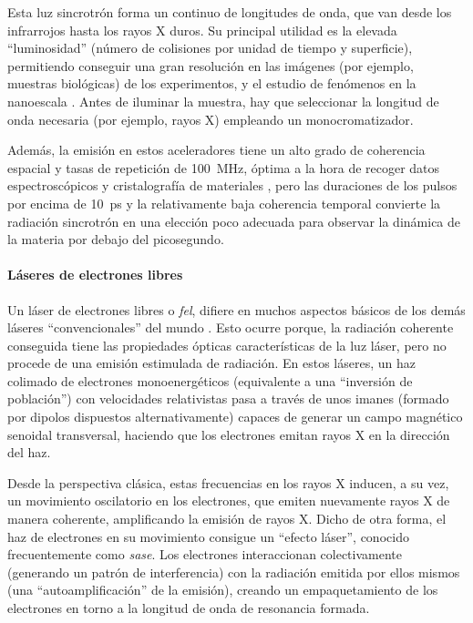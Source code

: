 Esta luz sincrotrón forma un continuo de longitudes de onda, que van desde los infrarrojos hasta los rayos X duros. Su principal utilidad es la elevada \enquote{luminosidad} (número de colisiones por unidad de tiempo y superficie), permitiendo conseguir una gran resolución en las imágenes (por ejemplo, muestras biológicas) de los experimentos, y el estudio de fenómenos en la nanoescala \autocite{Rose2020}. Antes de iluminar la muestra, hay que seleccionar la longitud de onda necesaria (por ejemplo, rayos X) empleando un monocromatizador. 

Además, la emisión en estos aceleradores tiene un alto grado de coherencia espacial y tasas de repetición de \qty{100}{MHz}, óptima a la hora de recoger datos espectroscópicos y cristalografía de materiales \autocite{Li2022,Sanchez-Martin2023}, pero las duraciones de los pulsos por encima de \qty{10}{ps} y la relativamente baja coherencia temporal convierte la radiación sincrotrón en una elección poco adecuada para observar la dinámica de la materia por debajo del picosegundo. 

\paragraph{Láseres de electrones libres}
Un láser de electrones libres o \emph{\acrfull{fel}}, difiere en muchos aspectos básicos de los demás láseres \enquote{convencionales} del mundo \autocite{Thorne2017}. Esto ocurre porque, la radiación coherente conseguida tiene las propiedades ópticas características de la luz láser, pero no procede de una emisión estimulada de radiación. En estos láseres, un haz colimado de electrones monoenergéticos (equivalente a una \enquote{inversión de población}) con velocidades relativistas pasa a través de unos imanes (formado por dipolos dispuestos alternativamente) capaces de generar un campo magnético senoidal transversal, haciendo que los electrones emitan rayos X en la dirección del haz.

Desde la perspectiva clásica, estas frecuencias en los rayos X inducen, a su vez, un movimiento oscilatorio en los electrones, que emiten nuevamente rayos X de manera coherente, amplificando la emisión de rayos X. Dicho de otra forma, el haz de electrones en su movimiento consigue un \enquote{efecto láser}, conocido frecuentemente como \emph{\acrfull{sase}}. Los electrones interaccionan colectivamente (generando un patrón de interferencia) con la radiación emitida por ellos mismos (una \enquote{autoamplificación} de la emisión), creando un empaquetamiento de los electrones en torno a la longitud de onda de resonancia formada. 

